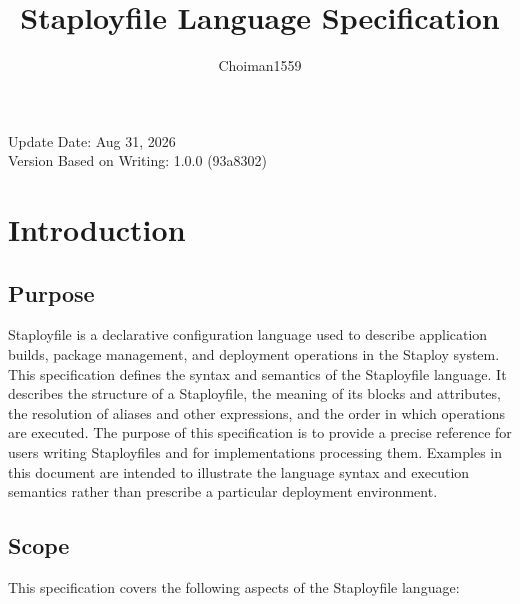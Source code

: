 \documentclass[11pt,a4paper]{article}
\title{Staployfile Language Specification}
\author{Choiman1559}
\date{}
\begin{document}
    \maketitle

    \begin{center}
        Update Date: Aug 31, 2026 \\
        Version Based on Writing: 1.0.0 (93a8302)
    \end{center}

    \tableofcontents
    \newpage


    \section{Introduction}\label{sec:introduction}

    \subsection{Purpose}\label{subsec:purpose}

    Staployfile is a declarative configuration language used to describe
    application builds, package management, and deployment operations in the Staploy system.
    This specification defines the syntax and semantics of the Staployfile language.
    It describes the structure of a Staployfile, the meaning of its
    blocks and attributes, the resolution of aliases and other expressions,
    and the order in which operations are executed.
    The purpose of this specification is to provide a precise reference for
    users writing Staployfiles and for implementations processing them.
    Examples in this document are intended to illustrate the language syntax
    and execution semantics rather than prescribe a particular deployment environment.

    \subsection{Scope}\label{subsec:scope}

    This specification covers the following aspects of the Staployfile
    language:
\end{document}
